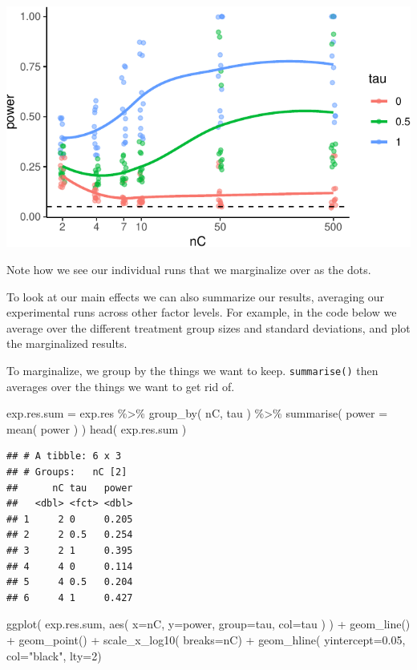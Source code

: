 \documentclass[
]{book}
\newenvironment{Shaded}{\begin{snugshade}}{\end{snugshade}}
\newcommand{\AttributeTok}[1]{\textcolor[rgb]{0.77,0.63,0.00}{#1}}
\newcommand{\DecValTok}[1]{\textcolor[rgb]{0.00,0.00,0.81}{#1}}
\newcommand{\FloatTok}[1]{\textcolor[rgb]{0.00,0.00,0.81}{#1}}
\newcommand{\FunctionTok}[1]{\textcolor[rgb]{0.00,0.00,0.00}{#1}}
\newcommand{\NormalTok}[1]{#1}
\newcommand{\OtherTok}[1]{\textcolor[rgb]{0.56,0.35,0.01}{#1}}
\newcommand{\SpecialCharTok}[1]{\textcolor[rgb]{0.00,0.00,0.00}{#1}}
\newcommand{\StringTok}[1]{\textcolor[rgb]{0.31,0.60,0.02}{#1}}
\begin{document}
\begin{center}\includegraphics[width=0.75\linewidth]{Designing-Simulations-in-R_files/figure-latex/plotPool-1} \end{center}

Note how we see our individual runs that we marginalize over as the dots.

To look at our main effects we can also summarize our results, averaging our
experimental runs across other factor levels. For example, in the code below
we average over the different treatment group sizes and standard deviations,
and plot the marginalized results.

To marginalize, we group by the things we want to keep. \texttt{summarise()} then
averages over the things we want to get rid of.

\begin{Shaded}
\begin{Highlighting}[]
\NormalTok{exp.res.sum }\OtherTok{=}\NormalTok{ exp.res }\SpecialCharTok{\%\textgreater{}\%} \FunctionTok{group\_by}\NormalTok{( nC, tau ) }\SpecialCharTok{\%\textgreater{}\%}
  \FunctionTok{summarise}\NormalTok{( }\AttributeTok{power =} \FunctionTok{mean}\NormalTok{( power ) )}
\FunctionTok{head}\NormalTok{( exp.res.sum )}
\end{Highlighting}
\end{Shaded}

\begin{verbatim}
## # A tibble: 6 x 3
## # Groups:   nC [2]
##      nC tau   power
##   <dbl> <fct> <dbl>
## 1     2 0     0.205
## 2     2 0.5   0.254
## 3     2 1     0.395
## 4     4 0     0.114
## 5     4 0.5   0.204
## 6     4 1     0.427
\end{verbatim}

\begin{Shaded}
\begin{Highlighting}[]
\FunctionTok{ggplot}\NormalTok{( exp.res.sum, }\FunctionTok{aes}\NormalTok{( }\AttributeTok{x=}\NormalTok{nC, }\AttributeTok{y=}\NormalTok{power, }\AttributeTok{group=}\NormalTok{tau, }\AttributeTok{col=}\NormalTok{tau ) ) }\SpecialCharTok{+}
  \FunctionTok{geom\_line}\NormalTok{() }\SpecialCharTok{+} \FunctionTok{geom\_point}\NormalTok{() }\SpecialCharTok{+}
  \FunctionTok{scale\_x\_log10}\NormalTok{( }\AttributeTok{breaks=}\NormalTok{nC) }\SpecialCharTok{+}
  \FunctionTok{geom\_hline}\NormalTok{( }\AttributeTok{yintercept=}\FloatTok{0.05}\NormalTok{, }\AttributeTok{col=}\StringTok{"black"}\NormalTok{, }\AttributeTok{lty=}\DecValTok{2}\NormalTok{)}
\end{Highlighting}
\end{Shaded}
\end{document}
